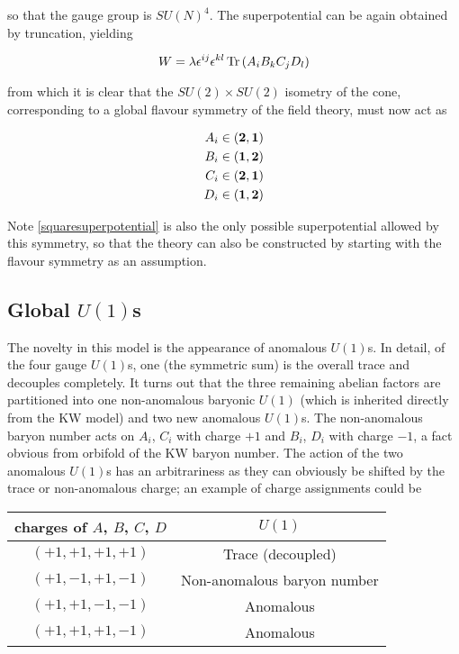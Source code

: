 so that the gauge group is $SU(N)^4$. The superpotential can be again obtained by truncation, yielding

\begin{equation}
	W = \lambda \epsilon^{ij} \epsilon^{kl} \operatorname{Tr}\left( A_i B_k C_j D_l \right)
	\label{squaresuperpotential}
\end{equation}

from which it is clear that the $SU(2) \times SU(2)$ isometry of the cone, corresponding to a global flavour symmetry of the field theory, must now act as

\begin{align}
	\begin{split}
		A_i \in (\mathbf{2}, \mathbf{1})\\
		B_i \in (\mathbf{1}, \mathbf{2})\\
		C_i \in (\mathbf{2}, \mathbf{1})\\
		D_i \in (\mathbf{1}, \mathbf{2})
	\end{split}
	\label{flavoursquare}
\end{align}

Note \eqref{squaresuperpotential} is also the only possible superpotential allowed by this symmetry\cite{Benvenutifourcycles}, so that the theory can also be constructed by starting with the flavour symmetry as an assumption.

\subsection{Global $U(1)$s}

The novelty in this model is the appearance of anomalous $U(1)$s. In detail, of the four gauge $U(1)$s, one (the symmetric sum) is the overall trace and decouples completely. It turns out that the three remaining abelian factors are partitioned into one non-anomalous baryonic $U(1)$ (which is inherited directly from the KW model) and two new anomalous $U(1)$s. The non-anomalous baryon number acts on $A_i$, $C_i$ with charge $+1$ and $B_i$, $D_i$ with charge $-1$, a fact obvious from orbifold of the KW baryon number. The action of the two anomalous $U(1)$s has an arbitrariness as they can obviously be shifted by the trace or non-anomalous charge; an example of charge assignments could be

\begin{center}
	\begin{tabular}[]{c|c}
		charges of $A$, $B$, $C$, $D$ & $U(1)$ \\ \hline \hline
		$(+1,+1,+1,+1)$ & Trace (decoupled) \\  \hline
		$(+1,-1,+1,-1)$ & Non-anomalous baryon number \\ 
		$(+1,+1,-1,-1)$ & Anomalous \\ 
		$(+1,+1,+1,-1)$ & Anomalous  
	\end{tabular}
\end{center}


